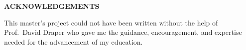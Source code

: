\documentclass[12pt]{report}
\begin{document}
\setcounter{page}{2}

\newpage

\mbox{}

\newpage

\singlespacing

\tableofcontents

\setcounter{tocdepth}{2}

\listoftables

\listoffigures

\newpage
\begin{center} \textbf{\large ACKNOWLEDGEMENTS} \end{center}
\bigskip
\noindent
This master's project could not have been written without the help of
Prof.~David Draper who gave me the guidance,
encouragement, and expertise needed for the advancement of my education.

\newpage
{}



\newpage
\printbibliography

\newpage
\printglossaries

\appendix

\end{document}
